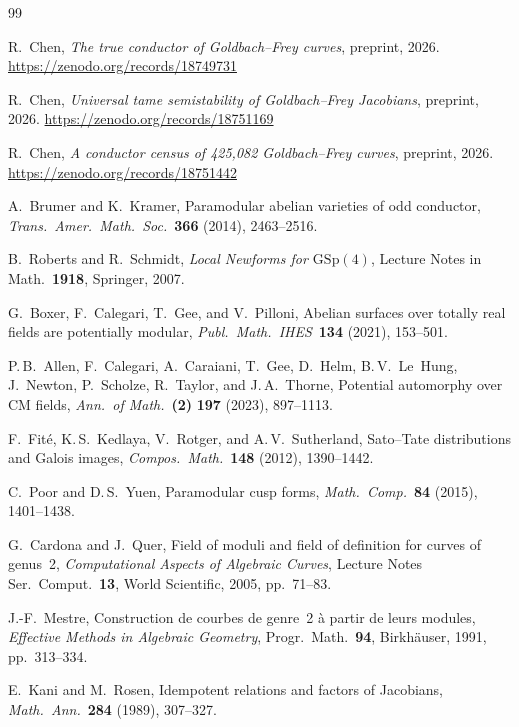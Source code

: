 \documentclass[11pt,a4paper]{article}
\newcommand{\GSp}{\mathrm{GSp}}
\theoremstyle{definition}
\theoremstyle{remark}
\begin{document}
\begin{thebibliography}{99}

R.~Chen,
\emph{The true conductor of Goldbach--Frey curves},
preprint, 2026.  \url{https://zenodo.org/records/18749731}

R.~Chen,
\emph{Universal tame semistability of Goldbach--Frey Jacobians},
preprint, 2026.  \url{https://zenodo.org/records/18751169}

R.~Chen,
\emph{A conductor census of 425,082 Goldbach--Frey curves},
preprint, 2026.  \url{https://zenodo.org/records/18751442}

A.~Brumer and K.~Kramer,
Paramodular abelian varieties of odd conductor,
\emph{Trans.\ Amer.\ Math.\ Soc.}~\textbf{366} (2014),
2463--2516.

B.~Roberts and R.~Schmidt,
\emph{Local Newforms for $\GSp(4)$},
Lecture Notes in Math.~\textbf{1918}, Springer, 2007.

G.~Boxer, F.~Calegari, T.~Gee, and V.~Pilloni,
Abelian surfaces over totally real fields are potentially modular,
\emph{Publ.\ Math.\ IHES}~\textbf{134} (2021), 153--501.

P.\,B.~Allen, F.~Calegari, A.~Caraiani, T.~Gee,
D.~Helm, B.\,V.~Le~Hung, J.~Newton, P.~Scholze,
R.~Taylor, and J.\,A.~Thorne,
Potential automorphy over CM fields,
\emph{Ann.\ of Math.}~\textbf{(2)} \textbf{197} (2023), 897--1113.

F.~Fit\'e, K.\,S.~Kedlaya, V.~Rotger, and A.\,V.~Sutherland,
Sato--Tate distributions and Galois images,
\emph{Compos.\ Math.}~\textbf{148} (2012), 1390--1442.

C.~Poor and D.\,S.~Yuen,
Paramodular cusp forms,
\emph{Math.\ Comp.}~\textbf{84} (2015), 1401--1438.

G.~Cardona and J.~Quer,
Field of moduli and field of definition for curves of genus~2,
\emph{Computational Aspects of Algebraic Curves},
Lecture Notes Ser.\ Comput.~\textbf{13},
World Scientific, 2005, pp.~71--83.

J.-F.~Mestre,
Construction de courbes de genre~2 \`a partir de leurs modules,
\emph{Effective Methods in Algebraic Geometry},
Progr.\ Math.~\textbf{94}, Birkh\"auser, 1991, pp.~313--334.

E.~Kani and M.~Rosen,
Idempotent relations and factors of Jacobians,
\emph{Math.\ Ann.}~\textbf{284} (1989), 307--327.


\end{thebibliography}
\end{document}
